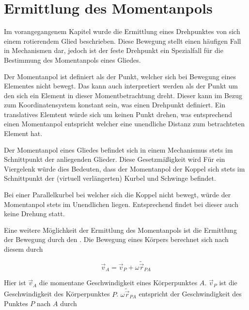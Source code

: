 \chapter{Ermittlung des Momentanpols}


Im vorangegangenem Kapitel wurde die Ermittlung eines Drehpunktes von sich einem rotierendem Glied beschrieben.
Diese Bewegung stellt einen häufigen Fall in Mechanismen dar, jedoch ist der feste Drehpunkt ein Spezialfall für die Bestimmung des Momentanpols eines Gliedes.

Der Momentanpol ist definiert als der Punkt, welcher sich bei Bewegung eines Elementes nicht bewegt.
Das kann auch interpretiert werden als der Punkt um den sich ein Element in dieser Momentbetrachtung dreht.
Dieser kann im Bezug zum Koordinatensystem konstant sein, was einen Drehpunkt definiert.
Ein translatives Elemtent würde sich um keinen Punkt drehen, was entsprechend einen Momentanpol entspricht welcher eine unendliche Distanz zum betrachteten Element hat.

Der Momentanpol eines Gliedes befindet sich in einem Mechanismus stets im Schnittpunkt der anliegenden Glieder.
Diese Gesetzmäßigkeit wird  %
Für ein Viergelenk würde dies Bedeuten, dass der Momentanpol der Koppel sich stets im Schnittpunkt der (virtuell verlängerten) Kurbel und Schwinge befindet.

Bei einer Parallelkurbel bei welcher sich die Koppel nicht bewegt, würde der Momentanpol stets im Unendlichen liegen.
Entsprechend findet bei dieser auch keine Drehung statt.

Eine weitere Möglichkeit der Ermittlung des Momentanpols ist die Ermittlung der Bewegung durch den . %
Die Bewegung eines Körpers berechnet sich nach diesem durch

\begin{equation}
    \vec{v}_A = \vec{v}_P + \omega \tilde{\vec{r}}_{PA}
    \label{eq:satz_von_euler}
\end{equation} 

Hier ist $\vec{v}_A$ die momentane Geschwindigkeit eines Körperpunktes $A$.
$\vec{v}_P$ ist die Geschwindigkeit des Körperpunktes $P$.
$\omega\tilde{\vec{r}}_{PA}$ entspricht der Geschwindigkeit des Punktes $P$ nach $A$ durch %

